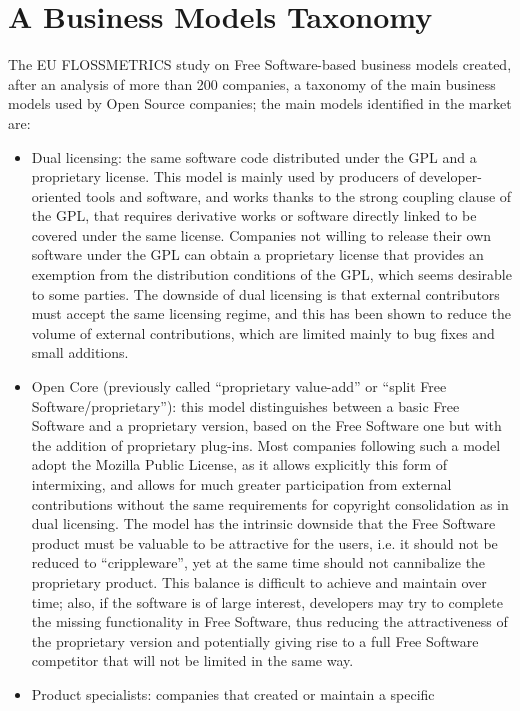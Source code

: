 \section*{A Business Models Taxonomy}

The EU FLOSSMETRICS study on Free Software-based business models created, after
an analysis of more than 200 companies, a taxonomy of the main business models
used by Open Source companies; the main models identified in the market are: 
\begin{itemize}
 \item Dual licensing: the same software code distributed under the GPL and a
proprietary license. This model is mainly used by producers of
developer-oriented tools and software, and works thanks to the strong coupling
clause of the GPL, that requires derivative works or software directly linked to
be covered under the same license. Companies not willing to release their own
software under the GPL can obtain a proprietary license that provides an
exemption from the distribution conditions of the GPL, which seems desirable to
some parties. The downside of dual licensing is that external contributors must
accept the same licensing regime, and this has been shown to reduce the volume
of external contributions, which are limited mainly to bug fixes and small
additions.
 \item Open Core (previously called ``proprietary value-add'' or ``split Free Software/proprietary''): this model distinguishes between a basic Free Software and a proprietary version, based on the Free Software one but with the addition of proprietary plug-ins. Most companies following such a model adopt the Mozilla Public License, as it allows explicitly this form of intermixing, and allows for much greater participation from external contributions without the same requirements for copyright consolidation as in dual licensing. The model has the intrinsic downside that the Free Software product must be valuable to be attractive for the users, i.e. it should not be reduced to ``crippleware'', yet at the same time should not cannibalize the proprietary product. This balance is difficult to achieve and maintain over time; also, if the software is of large interest, developers may try to complete the missing functionality in Free Software, thus reducing the attractiveness of the proprietary version and potentially giving rise to a full Free Software competitor that will not be limited in the same way.
 \item Product specialists: companies that created or maintain a specific

\end{itemize}
